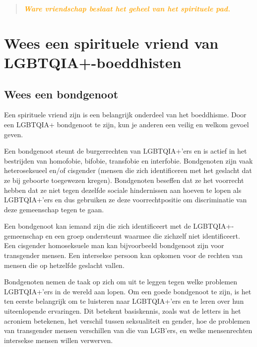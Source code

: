 \documentclass[12pt,openany]{book}
\begin{document}
\begin{quote}
\centering
\doublespacing
\textit{\Large \textcolor{orange}{\textbf{Ware vriendschap beslaat het geheel van het spirituele pad.}}}
\end{quote}

\chapter*{Wees een spirituele vriend van LGBTQIA+-boeddhisten}

\section*{Wees een bondgenoot}

Een spirituele vriend zijn is een belangrijk onderdeel van het boeddhisme. Door een LGBTQIA+ bondgenoot te zijn, kun je anderen een veilig en welkom gevoel geven.

Een  bondgenoot steunt de burgerrechten van LGBTQIA+'ers en is actief in het bestrijden van homofobie, bifobie, transfobie en interfobie. Bondgenoten zijn vaak heteroseksueel en/of cisgender (mensen die zich identificeren met het geslacht dat ze bij geboorte toegewezen kregen). Bondgenoten beseffen dat ze het voorrecht hebben dat ze niet tegen dezelfde sociale hindernissen aan hoeven te lopen als LGBTQIA+'ers en dus gebruiken ze deze voorrechtpositie om discriminatie van deze gemeenschap tegen te gaan. 

Een bondgenoot kan iemand zijn die zich identificeert met de LGBTQIA+-gemeenschap en een groep ondersteunt waarmee die zichzelf niet identificeert. Een cisgender homoseksuele man kan bijvoorbeeld bondgenoot zijn voor transgender mensen. Een intersekse persoon kan opkomen voor de rechten van mensen die op hetzelfde geslacht vallen.

Bondgenoten nemen de taak op zich om uit te leggen tegen welke problemen LGBTQIA+'ers in de wereld aan lopen. Om een goede bondgenoot te zijn, is het ten eerste belangrijk om te luisteren naar LGBTQIA+'ers en te leren over hun uiteenlopende ervaringen. Dit betekent basiskennis, zoals wat de letters in het acroniem betekenen, het verschil tussen seksualiteit en gender, hoe de problemen van transgender mensen verschillen van die van LGB'ers, en welke mensenrechten intersekse mensen willen verwerven.
\end{document}
